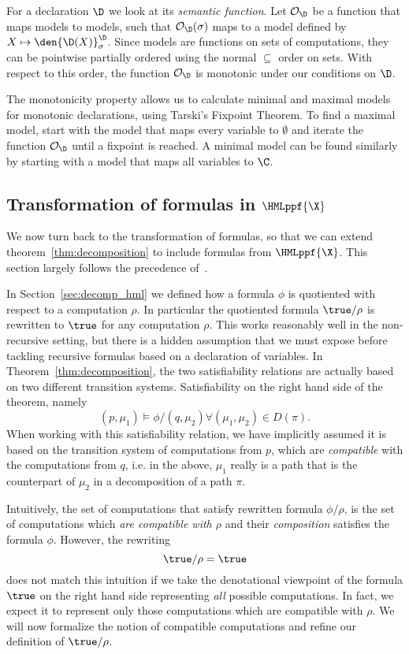 For a declaration $\D$ we look at its {\em semantic function}. 
Let $\mathcal{O}_\D$ be a function that maps models to models,
such that $\mathcal{O}_\D(\sigma)$ maps to a model defined by $X \mapsto 
\den{\D(X)}^\D_\sigma$. Since models are functions on sets of computations, they can
be pointwise partially ordered using the normal $\subseteq$ order on sets. With respect
to this order, the function $\mathcal{O}_\D$ is monotonic under our conditions on $\D$.

The monotonicity property allows us to calculate minimal and maximal models for
monotonic declarations, using Tarski's Fixpoint Theorem. To find a maximal model,
start with the model that maps every variable to $\emptyset$ and iterate the
function $\mathcal{O}_\D$ until a fixpoint is reached. A minimal model can be
found similarly by starting with a model that maps all variables to $\C$.


\subsection{Transformation of formulas in $\HMLppf{\X}$}

We now turn back to the transformation of formulas, so that we can extend 
theorem~\ref{thm:decomposition} to include formulas from $\HMLppf{\X}$. This
section largely follows the precedence of~\cite{anna}.

In Section~\ref{sec:decomp_hml} we defined how a formula $\phi$ is quotiented
with respect to a computation $\rho$. In particular the quotiented formula
$\true/\rho$ is rewritten to $\true$ for any computation $\rho$. This works
reasonably well in the non-recursive setting, but there is a hidden assumption
that we must expose before tackling recursive formulas based on a declaration
of variables. In Theorem~\ref{thm:decomposition}, the two satisfiability
relations are actually based on two different transition systems. Satisfiability
on the right hand side of the theorem, namely
\[
(p,\mu_1) \vDash \phi/(q,\mu_2)  \forall (\mu_1,\mu_2) \in D(\pi).
\]
When working with this satisfiability relation, we have implicitly assumed
it is based on the transition system of computations from $p$, which are
{\em compatible} with the computations from $q$, i.e. in the above, $\mu_1$
really is a path that is the counterpart of $\mu_2$ in a decomposition of a
path $\pi$.

Intuitively, the set of computations that satisfy rewritten formula $\phi/\rho$, is the
set of computations which {\em are compatible with $\rho$} and their {\em
composition} satisfies the formula $\phi$. However, the rewriting
\[  \true/\rho = \true \]
does not match this intuition if we take the denotational viewpoint of the formula
$\true$ on the right hand side representing {\em all} possible computations.
In fact, we expect it to represent only those computations which are compatible with $\rho$.
We will now formalize the notion of compatible computations and refine our definition
of $\true/\rho$.

